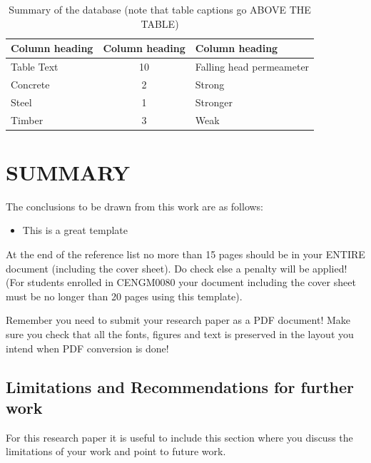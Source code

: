 \documentclass[a4paper,10pt]{article}
\begin{document}
\begin{table}[h]
\begin{center}
\caption{Summary of the database (note that table captions go ABOVE THE TABLE)}
\begin{tabular}{ |l|c|l| }
\hline
 \textbf{Column heading} & \textbf{Column heading}    & \textbf{Column heading} \\ \hline 
 Table Text     & 10     & Falling head permeameter \\  \hline 
 Concrete       & 2      & Strong \\ \hline 
 Steel          & 1      & Stronger \\ \hline 
 Timber         & 3      & Weak \\ 
 \hline
\end{tabular}
\label{tab_materials}
\end{center}
\end{table}











\section{SUMMARY}

The conclusions to be drawn from this work are as follows:
\begin{itemize}
    \item 	This is a great template
\end{itemize}


At the end of the reference list no more than 15 pages should be in your ENTIRE document (including the cover sheet). Do check else a penalty will be applied!  (For students enrolled in CENGM0080 your document including the cover sheet must be no longer than 20 pages using this template).

Remember you need to submit your research paper as a PDF document! Make sure you check that all the fonts, figures and text is preserved in the layout you intend when PDF conversion is done!


\subsection{Limitations and Recommendations for further work}

For this research paper it is useful to include this section where you discuss the limitations of your work and point to future work.
\end{document}
